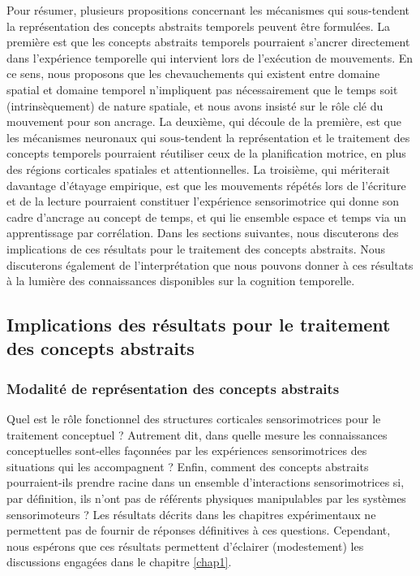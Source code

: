 \documentclass[
  a4paper,12pt,twoside,onecolumn,openright,final,oldfontcommands]{memoir}
\begin{document}
Pour résumer, plusieurs propositions concernant les mécanismes qui sous-tendent la représentation des concepts abstraits temporels peuvent être formulées. La première est que les concepts abstraits temporels pourraient s'ancrer directement dans l'expérience temporelle qui intervient lors de l'exécution de mouvements. En ce sens, nous proposons que les chevauchements qui existent entre domaine spatial et domaine temporel n'impliquent pas nécessairement que le temps soit (intrinsèquement) de nature spatiale, et nous avons insisté sur le rôle clé du mouvement pour son ancrage. La deuxième, qui découle de la première, est que les mécanismes neuronaux qui sous-tendent la représentation et le traitement des concepts temporels pourraient réutiliser ceux de la planification motrice, en plus des régions corticales spatiales et attentionnelles. La troisième, qui mériterait davantage d'étayage empirique, est que les mouvements répétés lors de l'écriture et de la lecture pourraient constituer l'expérience sensorimotrice qui donne son cadre d'ancrage au concept de temps, et qui lie ensemble espace et temps via un apprentissage par corrélation. Dans les sections suivantes, nous discuterons des implications de ces résultats pour le traitement des concepts abstraits. Nous discuterons également de l'interprétation que nous pouvons donner à ces résultats à la lumière des connaissances disponibles sur la cognition temporelle.

\hypertarget{implications-des-ruxe9sultats-pour-le-traitement-des-concepts-abstraits}{%
\subsection{Implications des résultats pour le traitement des concepts abstraits}\label{implications-des-ruxe9sultats-pour-le-traitement-des-concepts-abstraits}}

\hypertarget{modalituxe9-de-repruxe9sentation-des-concepts-abstraits}{%
\subsubsection{Modalité de représentation des concepts abstraits}\label{modalituxe9-de-repruxe9sentation-des-concepts-abstraits}}

Quel est le rôle fonctionnel des structures corticales sensorimotrices pour le traitement conceptuel ? Autrement dit, dans quelle mesure les connaissances conceptuelles sont-elles façonnées par les expériences sensorimotrices des situations qui les accompagnent ? Enfin, comment des concepts abstraits pourraient-ils prendre racine dans un ensemble d'interactions sensorimotrices si, par définition, ils n'ont pas de référents physiques manipulables par les systèmes sensorimoteurs ? Les résultats décrits dans les chapitres expérimentaux ne permettent pas de fournir de réponses définitives à ces questions. Cependant, nous espérons que ces résultats permettent d'éclairer (modestement) les discussions engagées dans le chapitre \ref{chap1}.
\end{document}
